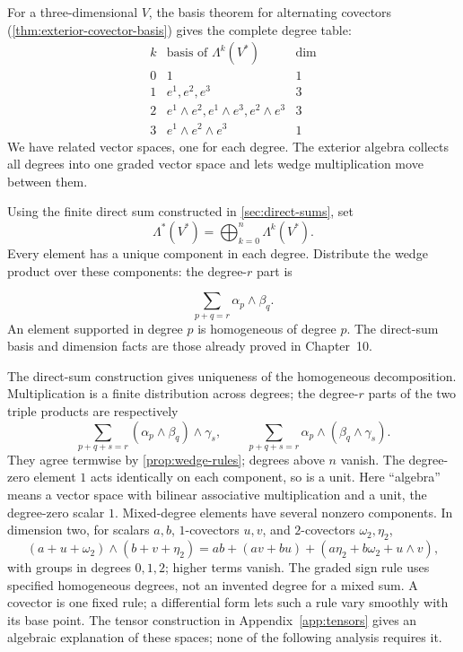 For a three-dimensional $V$, the basis theorem for alternating covectors
(\cref{thm:exterior-covector-basis}) gives the complete degree table:
\[
\begin{array}{c|l|c}
k&\text{basis of }\Lambda^k(V^*)&\dim\\\hline
0&1&1\\
1&e^1,e^2,e^3&3\\
2&e^1\wedge e^2,e^1\wedge e^3,e^2\wedge e^3&3\\
3&e^1\wedge e^2\wedge e^3&1
\end{array}
\]
We have related vector spaces, one for each degree. The exterior algebra
collects all degrees into one graded vector space and lets wedge
multiplication move between them.
\begin{center}
\end{center}

\begin{definition}\label{def:exterior-algebra}
Using the finite direct sum constructed in \cref{sec:direct-sums}, set
\[
\Lambda^*(V^*)=\bigoplus_{k=0}^n\Lambda^k(V^*).
\]
Every element has a unique component in each degree. Distribute the wedge
product over these components: the degree-$r$ part is

\[
\sum_{p+q=r}\alpha_p\wedge\beta_q.
\]
 An element supported in degree $p$
is homogeneous of degree $p$. The direct-sum basis and dimension facts
are those already proved in Chapter~10.
\end{definition}
The direct-sum construction gives uniqueness of the homogeneous
decomposition. Multiplication is a finite distribution across degrees;
the degree-$r$ parts of the two triple products are respectively
\[
\sum_{p+q+s=r}(\alpha_p\wedge\beta_q)\wedge\gamma_s,
\qquad
\sum_{p+q+s=r}\alpha_p\wedge(\beta_q\wedge\gamma_s).
\]
They agree termwise by \cref{prop:wedge-rules}; degrees above $n$ vanish.
The degree-zero element $1$ acts identically on each component, so is a unit.
Here ``algebra'' means a vector space with bilinear associative
multiplication and a unit, the degree-zero scalar $1$. Mixed-degree
elements have several nonzero components. In dimension two, for scalars
$a,b$, $1$-covectors $u,v$, and $2$-covectors $\omega_2,\eta_2$,
\[
(a+u+\omega_2)\wedge(b+v+\eta_2)
=ab+(av+bu)+(a\eta_2+b\omega_2+u\wedge v),
\]
with groups in degrees $0,1,2$; higher terms vanish. The graded sign rule
uses specified homogeneous degrees, not an invented degree for a mixed sum.
A covector is one fixed rule; a differential form lets such a rule vary
smoothly with its base point.
The tensor construction in Appendix~\ref{app:tensors} gives an
algebraic explanation of these spaces; none of the following analysis
requires it.


